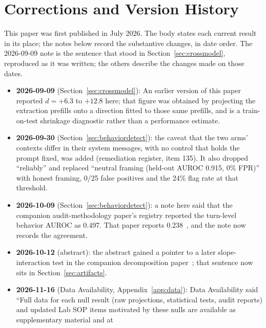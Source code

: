 \documentclass[11pt,letterpaper]{article}
\begin{document}
\section*{Corrections and Version History}\label{sec:corrections}

This paper was first published in July 2026. The body states each current result in its place; the
notes below record the substantive changes, in date order. The 2026-09-09 note is the sentence that
stood in Section~\ref{sec:crossmodel}, reproduced as it was written; the others describe the changes
made on those dates.

\begin{itemize}[leftmargin=*]
  \item \textbf{2026-09-09} (Section~\ref{sec:crossmodel}): An earlier version of this paper
    reported $d = +6.3$ to $+12.8$ here; that figure was obtained by projecting the extraction
    prefills onto a direction fitted to those same prefills, and is a train-on-test shrinkage
    diagnostic rather than a performance estimate.
  \item \textbf{2026-09-30} (Section~\ref{sec:behaviordetect}): the caveat that the two arms'
    contexts differ in their system messages, with no control that holds the prompt fixed, was
    added (remediation register, item 135). It also dropped ``reliably'' and replaced ``neutral framing (held-out AUROC 0.915, 0\% FPR)'' with honest framing, 0/25 false positives and the 24\% flag rate at that threshold.
  \item \textbf{2026-10-09} (Section~\ref{sec:behaviordetect}): a note here said that the companion
    audit-methodology paper's registry reported the turn-level behavior AUROC as 0.497. That paper
    reports 0.238~\cite{cc2026audit}, and the note now records the agreement.
  \item \textbf{2026-10-12} (abstract): the abstract gained a pointer to a later slope-interaction
    test in the companion decomposition paper~\cite{cc2026composites}; that sentence now sits in
    Section~\ref{sec:artifacts}.
  \item \begin{sloppypar}\textbf{2026-11-16} (Data Availability, Appendix~\ref{app:data}): Data Availability said
    ``Full data for each null result (raw projections, statistical tests, audit reports) and updated
    Lab SOP items motivated by these nulls are available as supplementary material and at

\end{sloppypar}
\end{itemize}
\end{document}
